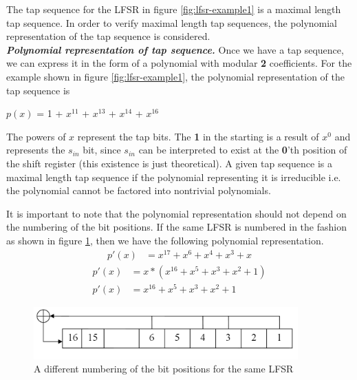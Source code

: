 The tap sequence for the LFSR in figure \ref{fig:lfsr-example1} is a maximal length tap sequence. In order to verify maximal length tap sequences, the polynomial representation of the tap sequence is considered.\\

\noindent \textit{\textbf{Polynomial representation of tap sequence.}} Once we have a tap sequence, we can express it in the form of a polynomial with modular \textbf{2} coefficients. For the example shown in figure \ref{fig:lfsr-example1}, the polynomial representation of the tap sequence is

\begin{center}
$p(x)$ =  1 + $x^{11}$ + $x^{13}$ + $x^{14}$ + $x^{16}$
\end{center}

The powers of $x$ represent the tap bits. The \textbf{1} in the starting is a result of $x^0$ and represents the $s_{in}$ bit, since $s_{in}$ can be interpreted to exist at the \textbf{0}'th position of the shift register (this existence is just theoretical). A given tap sequence is a maximal length tap sequence if the polynomial representing it is irreducible i.e. the polynomial cannot be factored into nontrivial polynomials.

It is important to note that the polynomial representation should not depend on the numbering of the bit positions. If the same LFSR is numbered in the fashion as shown in figure \ref{fig:lfsr-example2}, then we have the following polynomial representation.
\begin{align*}
p'(x) &= x^{17} + x^{6} + x^{4} + x^{3} + x
\end{align*}
\begin{align}
\label{eq:poly-1} p'(x) &= x*(x^{16} + x^{5} + x^{3} + x^{2} + 1)\\
\label{eq:poly-2} p'(x) &= x^{16} + x^{5} + x^{3} + x^{2} + 1
\end{align}

\begin{figure}[ht!]
	\centering
		\includegraphics[width=4in]{./figures/lfsr-example-reverse.PNG}
	\caption{A different numbering of the bit positions for the same LFSR}	
	\label{fig:lfsr-example2}
\end{figure}


